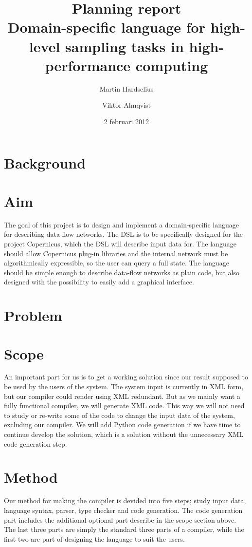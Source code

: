 \documentclass[a4paper]{article}
\title{Planning report\\
  \large{Domain-specific language for high-level
  sampling tasks in high-performance computing
  }
}
\author{Martin Hardselius \and Viktor Almqvist}
\date{2 februari 2012}
\begin{document}
\maketitle
\newpage

\section{Background}

\section{Aim}

The goal of this project is to design and implement a domain-specific
language for describing data-flow networks. The DSL is to be
specifically designed for the project Copernicus, which the DSL will
describe input data for. The language should allow Copernicus plug-in
libraries and the internal network must be algorithmically
expressible, so the user can query a full state. The language should
be simple enough to describe data-flow networks as plain code, but
also designed with the possibility to easily add a graphical
interface.


\section{Problem}

\section{Scope}

An important part for us is to get a working solution since our result
supposed to be used by the users of the system. The system input is
currently in XML form, but our compiler could render using XML
redundant. But as we mainly want a fully functional compiler, we will
generate XML code. This way we will not need to study or re-write some
of the code to change the input data of the system, excluding our
compiler. We will add Python code generation if we have time to
continue develop the solution, which is a solution without the
unnecessary XML code generation step.



\section{Method}
Our method for making the compiler is devided into five steps; study
input data, language syntax, parser, type checker and code
generation. The code generation part includes the additional optional
part describe in the scope section above. The last three parts are
simply the standard three parts of a compiler, while the first two are
part of designing the language to suit the users.
\end{document}
